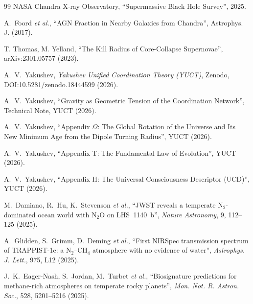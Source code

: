 \documentclass[11pt,a4paper]{article}
\begin{document}
	
	\begin{thebibliography}{99}
		NASA Chandra X-ray Observatory, ``Supermassive Black Hole Survey'', 2025.
		
		A.~Foord \emph{et al.}, ``AGN Fraction in Nearby Galaxies from Chandra'',
		Astrophys. J. (2017).
		
		T. Thomas, M. Yelland, ``The Kill Radius of Core-Collapse Supernovae'',
		arXiv:2301.05757 (2023).
		
		A.~V.~Yakushev, \emph{Yakushev Unified Coordination Theory (YUCT)},
		Zenodo, DOI:10.5281/zenodo.18444599 (2026).
		
		A.~V.~Yakushev, ``Gravity as Geometric Tension of the Coordination
		Network'', Technical Note, YUCT (2026).
		
		A.~V.~Yakushev, ``Appendix $\Omega$: The Global Rotation of the
		Universe and Its New Minimum Age from the Dipole Turning Radius'',
		YUCT (2026).
		
		A.~V.~Yakushev, ``Appendix T: The Fundamental Law of Evolution'',
		YUCT (2026).
		
		A.~V.~Yakushev, ``Appendix H: The Universal Consciousness Descriptor
		(UCD)'', YUCT (2026).
		
		M.~Damiano, R.~Hu, K.~Stevenson \emph{et al.},
		``JWST reveals a temperate N$_2$-dominated ocean world with N$_2$O
		on LHS~1140~b'', \emph{Nature Astronomy}, 9, 112--125 (2025).
		
		A.~Glidden, S.~Grimm, D.~Deming \emph{et al.},
		``First NIRSpec transmission spectrum of TRAPPIST-1e: a N$_2$--CH$_4$
		atmosphere with no evidence of water'', \emph{Astrophys. J. Lett.},
		975, L12 (2025).
		
		J.~K.~Eager-Nash, S.~Jordan, M.~Turbet \emph{et al.},
		``Biosignature predictions for methane-rich atmospheres on temperate
		rocky planets'', \emph{Mon. Not. R. Astron. Soc.}, 528, 5201--5216
		(2025).
	\end{thebibliography}
	
\end{document}
